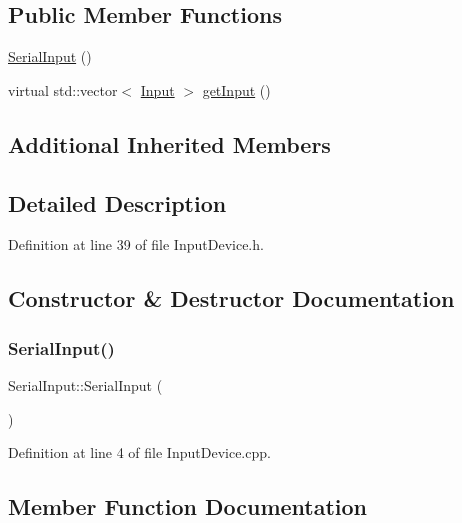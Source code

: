 \subsection*{Public Member Functions}
\begin{DoxyCompactItemize}
\item 
\hyperlink{class_serial_input_a94e105a9f9b4e8ce89a8e465cf2c0156}{Serial\+Input} ()
\item 
virtual std\+::vector$<$ \hyperlink{class_input_device_a75152d8f06b6d032036014e42e44688b}{Input} $>$ \hyperlink{class_serial_input_af7b4f4d7d059119c5e388a9747d25002}{get\+Input} ()
\end{DoxyCompactItemize}
\subsection*{Additional Inherited Members}


\subsection{Detailed Description}


Definition at line 39 of file Input\+Device.\+h.



\subsection{Constructor \& Destructor Documentation}
\mbox{\label{class_serial_input_a94e105a9f9b4e8ce89a8e465cf2c0156}} 
\subsubsection{\texorpdfstring{Serial\+Input()}{SerialInput()}}
{\footnotesize\ttfamily Serial\+Input\+::\+Serial\+Input (\begin{DoxyParamCaption}{ }\end{DoxyParamCaption})}



Definition at line 4 of file Input\+Device.\+cpp.



\subsection{Member Function Documentation}
\mbox{\label{class_serial_input_af7b4f4d7d059119c5e388a9747d25002}} 
